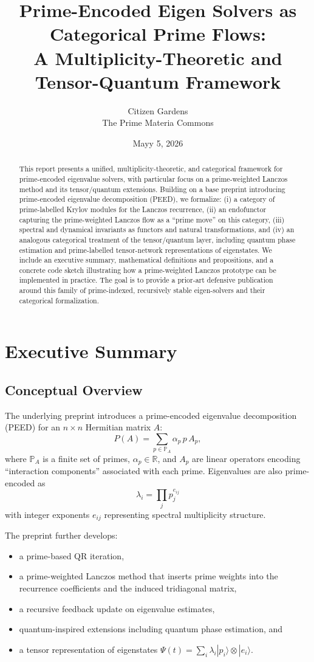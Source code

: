\documentclass[11pt]{article}
\title{Prime-Encoded Eigen Solvers as Categorical Prime Flows:\\
A Multiplicity-Theoretic and Tensor-Quantum Framework}
\author{Citizen Gardens \\ The Prime Materia Commons}
\date{Mayy 5, 2026}
\begin{document}
\maketitle

\begin{abstract}
This report presents a unified, multiplicity-theoretic, and categorical
framework for prime-encoded eigenvalue solvers, with particular focus
on a prime-weighted Lanczos method and its tensor/quantum extensions.
Building on a base preprint introducing prime-encoded eigenvalue
decomposition (PEED), we formalize:
(i) a category of prime-labelled Krylov modules for the Lanczos
recurrence,
(ii) an endofunctor capturing the prime-weighted Lanczos flow as a
``prime move'' on this category,
(iii) spectral and dynamical invariants as functors and natural
transformations, and
(iv) an analogous categorical treatment of the tensor/quantum layer,
including quantum phase estimation and prime-labelled tensor-network
representations of eigenstates.
We include an executive summary, mathematical definitions and
propositions, and a concrete code sketch illustrating how a
prime-weighted Lanczos prototype can be implemented in practice.
The goal is to provide a prior-art defensive publication around this
family of prime-indexed, recursively stable eigen-solvers and their
categorical formalization.
\end{abstract}
\newpage
\tableofcontents
\newpage
\section{Executive Summary}

\subsection{Conceptual Overview}

The underlying preprint introduces a prime-encoded eigenvalue
decomposition (PEED) for an $n\times n$ Hermitian matrix $A$:
\[
P(A) = \sum_{p\in \mathbb{P}_A} \alpha_p\, p\, A_p,
\]
where $\mathbb{P}_A$ is a finite set of primes, $\alpha_p\in\mathbb{R}$,
and $A_p$ are linear operators encoding ``interaction components''
associated with each prime.\cite{PrimeEigenSolvers} Eigenvalues are
also prime-encoded as
\[
\lambda_i = \prod_{j} p_j^{e_{ij}}
\]
with integer exponents $e_{ij}$ representing spectral multiplicity
structure.\cite{PrimeEigenSolvers}

The preprint further develops:
\begin{itemize}
  \item a prime-based QR iteration,
  \item a prime-weighted Lanczos method that inserts prime weights into
    the recurrence coefficients and the induced tridiagonal matrix,
  \item a recursive feedback update on eigenvalue estimates,
  \item quantum-inspired extensions including quantum phase estimation,
    and
  \item a tensor representation of eigenstates
    $\Psi(t)=\sum_i \lambda_i |p_i\rangle\otimes|e_i\rangle$.\cite{PrimeEigenSolvers}
\end{itemize}
\end{document}
